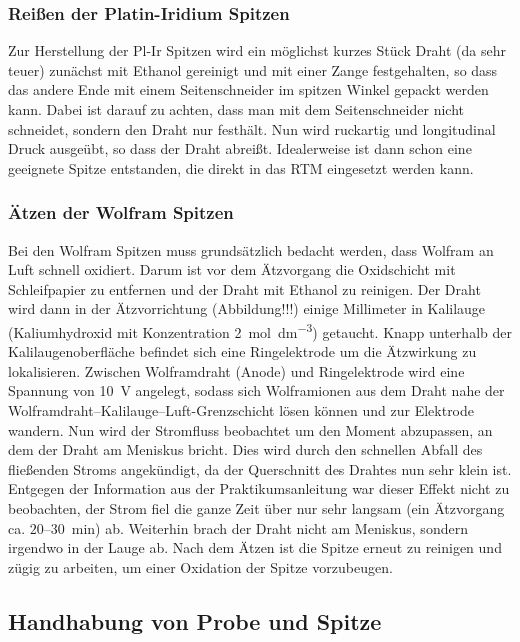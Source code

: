 \documentclass[10pt, a4paper]{article}
\begin{document}
\subsubsection{Reißen der Platin-Iridium Spitzen}

Zur Herstellung der Pl-Ir Spitzen wird ein möglichst kurzes Stück Draht (da sehr teuer) zunächst mit Ethanol gereinigt und mit einer Zange festgehalten, so dass das andere Ende mit einem Seitenschneider im spitzen Winkel gepackt werden kann.
Dabei ist darauf zu achten, dass man mit dem Seitenschneider nicht schneidet, sondern den Draht nur festhält.
Nun wird ruckartig und longitudinal Druck ausgeübt, so dass der Draht abreißt. Idealerweise ist dann schon eine geeignete Spitze entstanden, die direkt in das RTM eingesetzt werden kann.

\subsubsection{Ätzen der Wolfram Spitzen}

Bei den Wolfram Spitzen muss grundsätzlich bedacht werden, dass Wolfram an Luft schnell oxidiert. 
Darum ist vor dem Ätzvorgang die Oxidschicht mit Schleifpapier zu entfernen und  der Draht mit Ethanol zu reinigen.
Der Draht wird dann in der Ätzvorrichtung (Abbildung!!!) einige Millimeter in Kalilauge (Kaliumhydroxid mit Konzentration \SI{2}{\mol\per\cubic\deci\metre}) getaucht.
Knapp unterhalb der Kalilaugenoberfläche befindet sich eine Ringelektrode um die Ätzwirkung zu lokalisieren.
Zwischen Wolframdraht (Anode) und Ringelektrode wird eine Spannung von \SI{10}{\volt} angelegt, sodass sich Wolframionen aus dem Draht nahe der Wolframdraht--Kalilauge--Luft-Grenzschicht lösen können und zur Elektrode wandern.
Nun wird der Stromfluss beobachtet um den Moment abzupassen, an dem der Draht am Meniskus bricht.
Dies wird durch den schnellen Abfall des fließenden Stroms angekündigt, da der Querschnitt des Drahtes nun sehr klein ist.
Entgegen der Information aus der Praktikumsanleitung war dieser Effekt nicht zu beobachten, der Strom fiel die ganze Zeit über nur sehr langsam (ein Ätzvorgang ca. $20$--\SI{30}{\minute}) ab.
Weiterhin brach der Draht nicht am Meniskus, sondern irgendwo in der Lauge ab.  
Nach dem Ätzen ist die Spitze erneut zu reinigen und zügig zu arbeiten, um einer Oxidation der Spitze vorzubeugen.

\subsection{Handhabung von Probe und Spitze}
\end{document}
